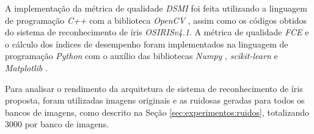 \par A implementação da métrica de qualidade \textit{\acrshort{DSMI}} foi feita utilizando a linguagem de programação \textit{C++} com a biblioteca \textit{OpenCV} \cite{opencv}, assim como os códigos obtidos do sistema de reconhecimento de íris \textit{OSIRISv4.1}. A métrica de qualidade \textit{\acrshort{FCE}} e o cálculo dos índices de desempenho foram implementados na linguagem de programação \textit{Python} com o auxílio das bibliotecas \textit{Numpy} \cite{numpy}, \textit{scikit-learn} \cite{scikitlearn} e \textit{Matplotlib} \cite{matplotlib}.


\par Para analisar o rendimento da arquitetura de sistema de reconhecimento de íris proposta, foram utilizadas imagens originais e as ruidosas geradas para todos os bancos de imagens, como descrito na Seção \ref{sec:experimentos:ruidos}, totalizando 3000 por banco de imagens.

